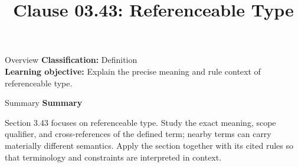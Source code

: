 \documentclass[10pt,letterpaper]{article}
\title{Clause 03.43: Referenceable Type}
\author{}
\date{}
\begin{document}
\maketitle
\begin{CornellOverviewBox}{Overview}
\textbf{Classification:} Definition\\[2pt]
\textbf{Learning objective:} Explain the precise meaning and rule context of referenceable type.
\end{CornellOverviewBox}\begin{CornellSummaryBox}{Summary}
{\sffamily\bfseries\color{Accent} Summary}\par\vspace{3pt}Section 3.43 focuses on referenceable type. Study the exact meaning, scope qualifier, and cross-references of the defined term; nearby terms can carry materially different semantics. Apply the section together with its cited rules so that terminology and constraints are interpreted in context.
\end{CornellSummaryBox}
\end{document}
